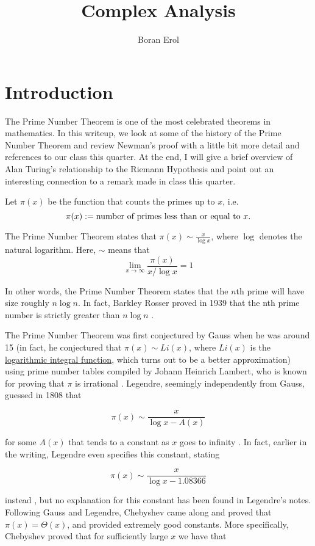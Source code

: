 \documentclass{article}
\title{Complex Analysis}
\author{Boran Erol}
\theoremstyle{definition}
\begin{document}
\maketitle

\section{Introduction}

The Prime Number Theorem is one of the most celebrated theorems in mathematics. In this writeup,
we look at some of the history of the Prime Number Theorem and review Newman's proof with a little bit 
more detail and references to our class this quarter. At the end,
I will give a brief overview of Alan Turing's relationship to the Riemann Hypothesis
and point out an interesting connection to a remark made in class this quarter.

Let $ \pi(x) $ be the function that counts the primes up to $ x $, i.e.\[ \pi(x) := \text{number of primes less than or equal to $ x $} .\]

The Prime Number Theorem states that $ \pi(x) \sim \frac{x}{\log x} $, where $\log $ denotes the natural logarithm.
Here, $ \sim $ means that \[ \lim_{x \to \infty} \frac{ \pi(x)}{x/ \log{x}} = 1 \]

In other words, the Prime Number Theorem states that the $n$th prime will have size roughly $ n \log n $.
In fact, Barkley Rosser proved in 1939 that the nth prime number is strictly greater than $ n \log n $ \cite{rosser_n-th_1939}.

The Prime Number Theorem was first conjectured by Gauss when he was around 15 (in fact, 
he conjectured that $ \pi(x) \sim Li(x) $, where $ Li(x) $ is the \href{https://en.wikipedia.org/wiki/Logarithmic_integral_function}{logarithmic integral function}, which turns out to be a better approximation) 
using prime number tables compiled by Johann Heinrich Lambert, who is
known for proving that $ \pi $ is irrational \cite{klyve_origin_2018} \cite{noauthor_histoire_nodate}. Legendre, seemingly independently from Gauss,
guessed in 1808 that

\[ \pi(x) \sim \frac{x}{\log x - A(x)} \]

for some $ A(x) $ that tends to a constant as $ x $ goes to infinity \cite{bateman_hundred_1996}. In fact,
earlier in the writing, Legendre even specifies this constant, stating 

\[ \pi(x) \sim \frac{x}{\log x - 1.08366} \]

instead \cite{bambah_centennial_2000}, but no explanation for this constant has been found in Legendre's notes.
Following Gauss and Legendre, Chebyshev came along and proved that $ \pi(x) = \Theta(x) $,
and provided extremely good constants. More specifically, Chebyshev \cite{bateman_hundred_1996} proved that for 
sufficiently large $ x $ we have that
\end{document}
